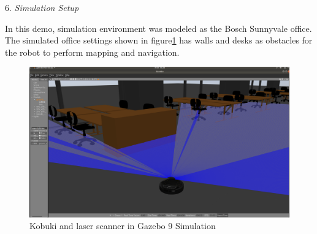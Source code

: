 \documentclass[letterpaper, 10 pt, conference]{ieeeconf}  %
\begin{document}
6. \textit{Simulation Setup} \par\vspace{5pt} 
In this demo, simulation environment was modeled as the Bosch Sunnyvale office. The simulated office settings shown in figure\ref{fig:gazebo} has walls and desks as obstacles for the robot to perform mapping and navigation. \par\vspace{5pt} 
\begin{figure}[htp!]
  \includegraphics[width=\linewidth]{gazebo_simulation.png}
  \caption{Kobuki and laser scanner in Gazebo 9 Simulation } 
  \label{fig:gazebo}
\end{figure}
\end{document}
